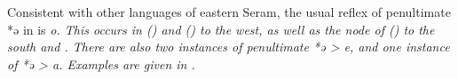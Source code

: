 
Consistent with other languages of eastern Seram,
the usual reflex of penultimate *ə in  is \it{o}.
This occurs in  ()
and  () to the west,
as well as the  node of 
() to the south and .
There are also two instances of penultimate *ə > \it{e},
and one instance of *ə > \it{a}.
Examples are given in .


